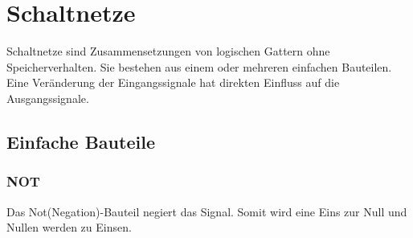 \documentclass[12pt,a4paper]{article}
\begin{document}
\section{Schaltnetze}
    Schaltnetze sind Zusammensetzungen von logischen Gattern ohne Speicherverhalten. Sie bestehen aus einem oder mehreren einfachen Bauteilen. Eine Veränderung der Eingangssignale hat direkten Einfluss auf die Ausgangssignale.
    
\subsection{Einfache Bauteile}
    \subsubsection{NOT}
        Das Not(Negation)-Bauteil negiert das Signal. Somit wird eine Eins zur Null und Nullen werden zu Einsen.
            \begin{center}
            \end{center}
\end{document}
